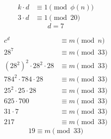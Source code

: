 \begin{align*}
    k \cdot d & \equiv 1 \pmod {\phi(n)} \\
    3 \cdot d & \equiv 1 \pmod {20}
\end{align*}
\[
    \boxed{d = 7}
\]

\begin{align*}
    c^{d}                              & \equiv m \pmod {n}  \\
    28^{7}                             & \equiv m \pmod {33} \\
    (28^{2})^{2} \cdot 28^{2} \cdot 28 & \equiv m \pmod {33} \\
    784^{2} \cdot 784 \cdot 28         & \equiv m \pmod {33} \\
    25^{2} \cdot 25 \cdot 28           & \equiv m \pmod {33} \\
    625 \cdot 700                      & \equiv m \pmod {33} \\
    31 \cdot 7                         & \equiv m \pmod {33} \\
    217                                & \equiv m \pmod {33}
\end{align*}
\[
    \boxed{19 \equiv m \pmod {33}}
\]